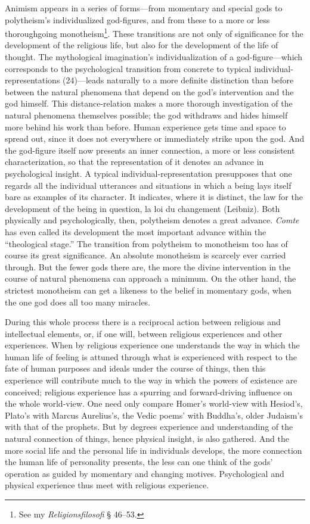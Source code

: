 \documentclass[12pt,a4paper]{book}
\newcommand{\opage}[1]{\marginnote{\footnotesize\textit{[#1]}}}
\begin{document}
\opage{115}Animism appears in a series of forms---from momentary and special gods to
polytheism's individualized god-figures, and from these to a more or less
thoroughgoing monotheism\footnote{See my \emph{Religionsfilosofi} §
46--53.}. These transitions are not only of significance for the
development of the religious life, but also for the development of the life
of thought. The mythological imagination's individualization of a
god-figure---which corresponds to the psychological transition from
concrete to typical individual-representations (24)---leads naturally to a
more definite distinction than before between the natural phenomena that
depend on the god's intervention and the god himself. This distance-relation
makes a more thorough investigation of the natural phenomena themselves
possible; the god withdraws and hides himself more behind his work than
before. Human experience gets time and space to spread out, since it does
not everywhere or immediately strike upon the god. And the god-figure
itself now presents an inner connection, a more or less consistent
characterization, so that the representation of it denotes an advance in
psychological insight. A typical individual-representation presupposes that
one regards all the individual utterances and situations in which a being
lays itself bare as examples of its character. It indicates, where it is
distinct, the law for the development of the being in question, la loi du
changement (Leibniz). Both physically and psychologically, then, polytheism denotes a great advance. \emph{Comte} has even called its development the most
important advance within the ``theological stage.'' The transition from
polytheism to monotheism too has of course its great significance. An
absolute monotheism is scarcely ever carried through. But the fewer gods
there are, the more the divine intervention in the course of natural
phenomena can approach a minimum. On the other hand, the strictest
monotheism can get a likeness to the belief in momentary gods, when the one
god does all too many miracles.

During this whole process there is a reciprocal action between religious
and intellectual elements, or, if one will, between religious experiences
and other experiences. When by \opage{116}religious experience one understands the way
in which the human life of feeling is attuned through what is experienced
with respect to the fate of human purposes and ideals under the course of
things, then this experience will contribute much to the way in which the
powers of existence are conceived; religious experience has a spurring and
forward-driving influence on the whole world-view. One need only compare
Homer's world-view with Hesiod's, Plato's with Marcus Aurelius's, the Vedic
poems' with Buddha's, older Judaism's with that of the prophets. But by
degrees experience and understanding of the natural connection of things,
hence physical insight, is also gathered. And the more social life and the
personal life in individuals develops, the more connection the human life
of personality presents, the less can one think of the gods' operation as
guided by momentary and changing motives. Psychological and physical
experience thus meet with religious experience.
\end{document}
